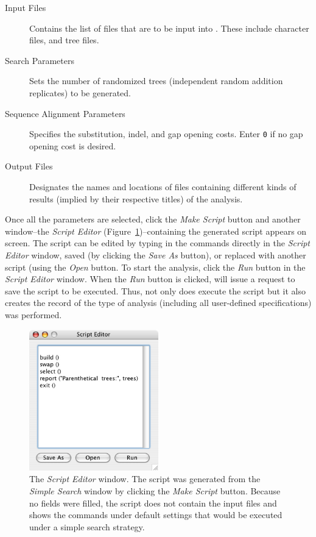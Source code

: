 \begin{description}
    \item[Input Files]
        Contains the list of files that are to be input into \poy. These include
        character files, and tree files.
    \item[Search Parameters]
        Sets the number of randomized trees (independent random addition replicates)
        to be generated.
    \item[Sequence Alignment Parameters]
        Specifies the substitution, indel, and gap opening costs. Enter \texttt{0} if no
        gap opening cost is desired.
    \item[Output Files]
        Designates the names and locations of files containing different kinds of results
        (implied by their respective titles) of the analysis.
\end{description}

Once all the parameters are selected, click the \emph{Make Script} button and another
window--the \emph{Script Editor} (Figure~\ref{fig:ScriptEditor_Window})--containing the generated script appears on screen. The
script can be edited by typing in the commands directly in the \emph{Script Editor} window,
 saved (by clicking the \emph{Save As} button), or replaced with another script (using 
 the \emph{Open} button. To start the analysis, click the \emph{Run} button in the 
 \emph{Script Editor} window. When the \emph{Run} button is clicked, \poy will issue a
 request to save the script to be executed. Thus, not only does \poy execute the script but
 it also creates the record of the type of analysis (including all user-defined specifications) was performed.
 
 \begin{figure}[htpb]
    \begin{center}
        \includegraphics[width=0.5\textwidth]{figures/scripteditor_window.jpg}
    \end{center}
    \caption{The \emph{Script Editor} window. The script was generated from the \emph{Simple Search} window by clicking the \emph{Make Script} button. Because no fields were filled, the script does not contain the input files and shows the commands under default settings that would be executed under a simple search strategy.}
    \label{fig:ScriptEditor_Window}
\end{figure}


